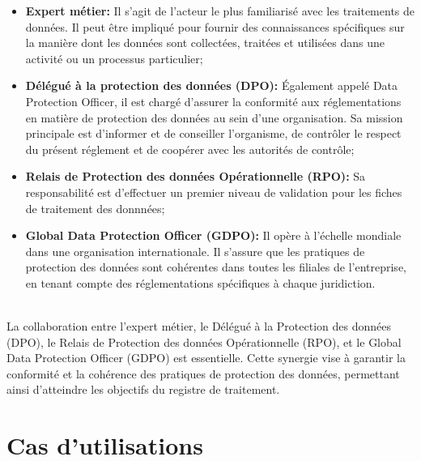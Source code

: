 \begin{itemize}
    \item \textbf{Expert métier:} Il s'agit de l'acteur le plus familiarisé avec les traitements de données. Il peut être impliqué pour fournir des connaissances spécifiques sur la manière dont les données sont collectées, traitées et utilisées dans une activité ou un processus particulier; \\
    \item \textbf{Délégué à la protection des données (DPO):} Également appelé Data Protection Officer, il est chargé d'assurer la conformité aux réglementations en matière de protection des données au sein d'une organisation. Sa mission principale est d'informer et de conseiller l'organisme, de contrôler le respect du présent réglement et de coopérer avec les autorités de contrôle;\\
    \item \textbf{Relais de Protection des données Opérationnelle (RPO):} Sa responsabilité est d'effectuer un premier niveau de validation pour les fiches de traitement des donnnées;\\
    \item \textbf{Global Data Protection Officer (GDPO):} Il opère à l'échelle mondiale dans une organisation internationale. Il s'assure que les pratiques de protection des données sont cohérentes dans toutes les filiales de l'entreprise, en tenant compte des réglementations spécifiques à chaque juridiction. \\ \\
\end{itemize}


\noindent La collaboration entre l'expert métier, le Délégué à la Protection des données (DPO), le Relais de Protection des données Opérationnelle (RPO), et le Global Data Protection Officer (GDPO) est essentielle. Cette synergie vise à garantir la conformité et la cohérence des pratiques de protection des données, permettant ainsi d'atteindre les objectifs du registre de traitement.







\clearpage


\section{Cas d'utilisations}

